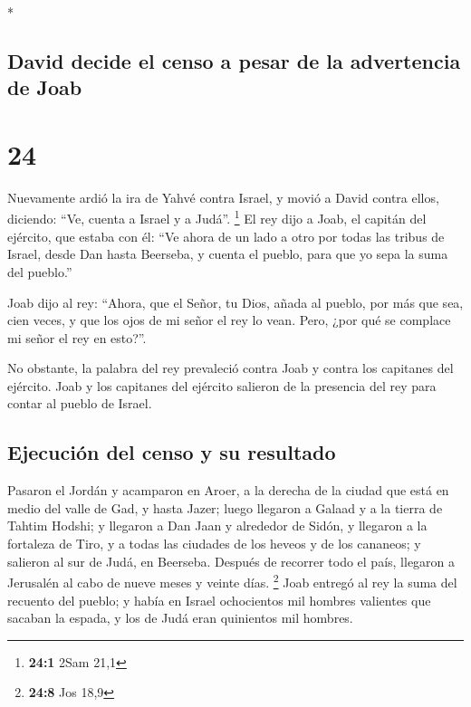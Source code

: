 \begin{paracol}{2}
\begin{otherlanguage}{english}
\end{otherlanguage}

\switchcolumn[0]*

\hypertarget{david-decide-el-censo-a-pesar-de-la-advertencia-de-joab}{%
\subsection{David decide el censo a pesar de la advertencia de
Joab}\label{david-decide-el-censo-a-pesar-de-la-advertencia-de-joab}}

\hypertarget{section-46}{%
\section{24}\label{section-46}}

 Nuevamente ardió la ira de Yahvé contra Israel, y movió a
David contra ellos, diciendo: ``Ve, cuenta a Israel y a Judá''.
\footnote{\textbf{24:1} 2Sam 21,1}  El rey dijo a Joab, el
capitán del ejército, que estaba con él: ``Ve ahora de un lado a otro
por todas las tribus de Israel, desde Dan hasta Beerseba, y cuenta el
pueblo, para que yo sepa la suma del pueblo.''

 Joab dijo al rey: ``Ahora, que el Señor, tu Dios, añada
al pueblo, por más que sea, cien veces, y que los ojos de mi señor el
rey lo vean. Pero, ¿por qué se complace mi señor el rey en esto?''.

 No obstante, la palabra del rey prevaleció contra Joab y
contra los capitanes del ejército. Joab y los capitanes del ejército
salieron de la presencia del rey para contar al pueblo de Israel.

\hypertarget{ejecuciuxf3n-del-censo-y-su-resultado}{%
\subsection{Ejecución del censo y su
resultado}\label{ejecuciuxf3n-del-censo-y-su-resultado}}

 Pasaron el Jordán y acamparon en Aroer, a la derecha de
la ciudad que está en medio del valle de Gad, y hasta Jazer;
 luego llegaron a Galaad y a la tierra de Tahtim Hodshi; y
llegaron a Dan Jaan y alrededor de Sidón,  y llegaron a la
fortaleza de Tiro, y a todas las ciudades de los heveos y de los
cananeos; y salieron al sur de Judá, en Beerseba.  Después
de recorrer todo el país, llegaron a Jerusalén al cabo de nueve meses y
veinte días. \footnote{\textbf{24:8} Jos 18,9}  Joab
entregó al rey la suma del recuento del pueblo; y había en Israel
ochocientos mil hombres valientes que sacaban la espada, y los de Judá
eran quinientos mil hombres.


\end{paracol}
